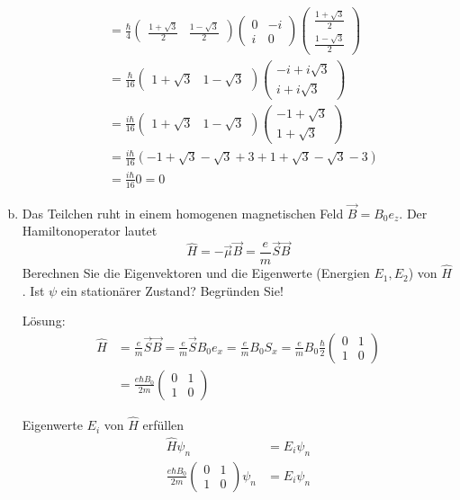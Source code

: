 \documentclass{scrartcl}
\newcommand{\Sx}{\begin{pmatrix}0&1\\1&0\end{pmatrix}}
\begin{document}
\begin{enumerate}[a)]
\begin{align*}
	&= 	
	\frac \hbar 4 \begin{pmatrix}\frac{1+\sqrt 3}{2} & \frac{1-\sqrt 3}{2}\end{pmatrix}
	\begin{pmatrix} 0&-i\\i&0 \end{pmatrix}
	\begin{pmatrix}\frac{1+\sqrt 3}{2}\\\frac{1-\sqrt 3}{2}\end{pmatrix}\\
	&=
	\frac \hbar {16} \begin{pmatrix}1+\sqrt 3 & 1-\sqrt 3\end{pmatrix}
	\begin{pmatrix}-i+i\sqrt 3\\i+i\sqrt 3\end{pmatrix}\\
	&=
	\frac {i\hbar}{16} \begin{pmatrix}1+\sqrt 3 & 1-\sqrt 3\end{pmatrix}
	\begin{pmatrix}-1+\sqrt 3\\1+\sqrt 3\end{pmatrix}\\
	&=
	\frac {i\hbar}{16} (-1 + \sqrt 3 -\sqrt 3 + 3 + 1 + \sqrt 3  -\sqrt 3 -3) \\
	&=
	\frac{i\hbar}{16} 0 = 0
\end{align*}

\item Das Teilchen ruht in einem homogenen magnetischen Feld $\vec B = B_0 e_z$. Der Hamiltonoperator lautet
\[\hat H = -\vec \mu \vec B = \frac em \vec S \vec B \]
Berechnen Sie die Eigenvektoren und die Eigenwerte (Energien $E_1, E_2$) von $\hat H$. Ist $\psi$ ein stationärer Zustand? Begründen Sie!
\item[Lösung:]
\begin{align*}
\hat H &= \frac em \vec S \vec B = \frac em \vec S B_0 e_x = \frac em B_0 S_x = \frac em B_0 \frac \hbar 2 \begin{pmatrix}0&1\\1&0\end{pmatrix} \\
&= \frac{e\hbar B_0}{2m}\Sx
\end{align*}

Eigenwerte $E_i$ von $\hat  H$ erfüllen
\begin{align*}
\hat H \psi_n						&= E_i \psi_n			\\
\frac{e\hbar B_0}{2m}\Sx \psi_n
&= 
E_i \psi_n
\end{align*}


\end{enumerate}
\end{document}
